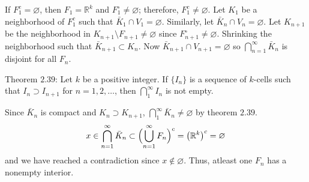 \begin{exercise}
  If \(F_1^c = \varnothing\), then \(F_1 = \mathbb{R}^k\) and
  \(F_1^{\circ}\neq\varnothing\); therefore, \(F_1^c\neq\varnothing\).
  Let \(K_1\) be a neighborhood of \(F_1^c\) such that
  \(\bar{K}_1\cap V_1 = \varnothing\).
  Similarly, let \(\bar{K}_n\cap V_n = \varnothing\).
  Let \(K_{n + 1}\) be the neighborhood in
  \(K_{n + 1}\setminus F_{n + 1}\neq\varnothing\) since
  \(F_{n + 1}^{\circ}\neq\varnothing\).
  Shrinking the neighborhood such that \(\bar{K}_{n + 1}\subset K_n\).
  Now \(\bar{K}_{n + 1}\cap V_{n + 1} = \varnothing\) so
  \(\bigcap_{n = 1}^{\infty}\bar{K}_n\) is disjoint for all \(F_n\).
  \par\smallskip
  Theorem \(2.39\): Let \(k\) be a positive integer.
  If \(\{I_n\}\) is a sequence of \(k\)-cells such that
  \(I_n\supset I_{n + 1}\) for \(n = 1,2,\ldots\), then
  \(\bigcap_1^{\infty}I_n\) is not empty.
  \par\smallskip
  Since \(\bar{K}_n\) is compact and \(K_n\supset K_{n + 1}\),
  \(\bigcap_1^{\infty}\bar{K}_n\neq\varnothing\) by theorem \(2.39\).
  \[
  x\in\bigcap_{n = 1}^{\infty}\bar{K}_n\subset
  \Bigl(\bigcup_{n = 1}^{\infty}F_n\Bigr)^c = \bigl(\mathbb{R}^k\bigr)^c
  = \varnothing
  \]
  and we have reached a contradiction since \(x\not\in\varnothing\).
  Thus, atleast one \(F_n\) has a nonempty interior.
\end{exercise}

